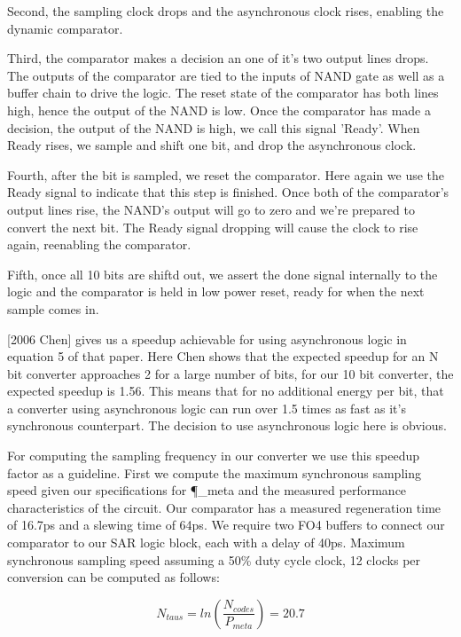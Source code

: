 \documentclass[10pt,journal]{IEEEtran}\usepackage{longtable}
\begin{document}
Second, the sampling clock drops and the asynchronous clock rises, enabling the dynamic comparator.

Third, the comparator makes a decision an one of it's two output lines drops. 
The outputs of the comparator are tied to the inputs of NAND gate as well as a buffer chain to drive the logic.
The reset state of the comparator has both lines high, hence the output of the NAND is low.
Once the comparator has made a decision, the output of the NAND is high, we call this signal 'Ready'. When Ready rises, we sample and shift one bit, and drop the asynchronous clock.

Fourth, after the bit is sampled, we reset the comparator. Here again we use the Ready signal to indicate that this step is finished. Once both of the comparator's output lines rise, the NAND's output will go to zero and we're prepared to convert the next bit. The Ready signal dropping will cause the clock to rise again, reenabling the comparator.

Fifth, once all 10 bits are shiftd out, we assert the done signal internally to the logic and the comparator is held in low power reset, ready for when the next sample comes in.

[2006 Chen] gives us a speedup achievable for using asynchronous logic in equation 5 of that paper. Here Chen shows that the expected speedup for an N bit converter approaches 2 for a large number of bits, for our 10 bit converter, the expected speedup is 1.56.
This means that for no additional energy per bit, that a converter using asynchronous logic can run over 1.5 times as fast as it's synchronous counterpart. The decision to use asynchronous logic here is obvious.

For computing the sampling frequency in our converter we use this speedup factor as a guideline. First we compute the maximum synchronous sampling speed given our specifications for \P_{meta} and the measured performance characteristics of the circuit. Our comparator has a measured regeneration time of 16.7ps and a slewing time of 64ps. We require two FO4 buffers to connect our comparator to our SAR logic block, each with a delay of 40ps. Maximum synchronous sampling speed assuming a 50\% duty cycle clock, 12 clocks per conversion can be computed as follows:

\begin{equation}
  N_{taus} = ln\left(\frac{N_{codes}}{P_{meta}}\right) = 20.7
\end{equation}
\end{document}
